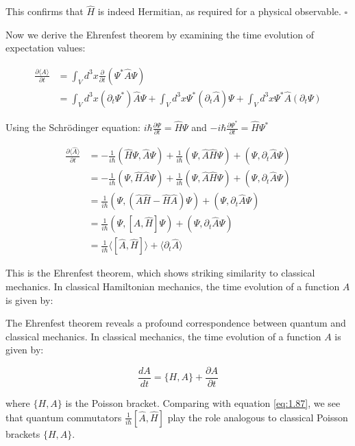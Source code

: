 \documentclass[italian]{HKNdocument}
\begin{document}
This confirms that $\hat{H}$ is indeed Hermitian, as required for a physical observable. $\square$

Now we derive the Ehrenfest theorem by examining the time evolution of expectation values:

\begin{align}
\frac{\partial\langle\hat{A}\rangle}{\partial t} &= \int_V d^3x\frac{\partial}{\partial t}(\Psi^*\hat{A}\Psi) \\
&= \int_V d^3x(\partial_t\Psi^*)\hat{A}\Psi + \int_V d^3x\Psi^*(\partial_t\hat{A})\Psi + \int_V d^3x\Psi^*\hat{A}(\partial_t\Psi)
\end{align}

Using the Schrödinger equation:
$i\hbar\frac{\partial\Psi}{\partial t} = \hat{H}\Psi$ and $-i\hbar\frac{\partial\Psi^*}{\partial t} = \hat{H}\Psi^*$

\begin{align}
\frac{\partial\langle\hat{A}\rangle}{\partial t} &= -\frac{1}{i\hbar}(\hat{H}\Psi, \hat{A}\Psi) + \frac{1}{i\hbar}(\Psi, \hat{A}\hat{H}\Psi) + (\Psi, \partial_t\hat{A}\Psi) \\
&= -\frac{1}{i\hbar}(\Psi, \hat{H}\hat{A}\Psi) + \frac{1}{i\hbar}(\Psi, \hat{A}\hat{H}\Psi) + (\Psi, \partial_t\hat{A}\Psi) \\
&= \frac{1}{i\hbar}(\Psi, (\hat{A}\hat{H} - \hat{H}\hat{A})\Psi) + (\Psi, \partial_t\hat{A}\Psi) \label{eq:1.87} \\
&= \frac{1}{i\hbar}(\Psi, [\hat{A}, \hat{H}]\Psi) + (\Psi, \partial_t\hat{A}\Psi) \\
&= \frac{1}{i\hbar}\langle[\hat{A}, \hat{H}]\rangle + \langle\partial_t\hat{A}\rangle
\end{align}

This is the Ehrenfest theorem, which shows striking similarity to classical mechanics. In classical Hamiltonian mechanics, the time evolution of a function $A$ is given by:


The Ehrenfest theorem reveals a profound correspondence between quantum and classical mechanics. In classical mechanics, the time evolution of a function $A$ is given by:

\begin{equation}
\frac{dA}{dt} = \{H,A\} + \frac{\partial A}{\partial t}
\end{equation}

where $\{H,A\}$ is the Poisson bracket. Comparing with equation \eqref{eq:1.87}, we see that quantum commutators $\frac{1}{i\hbar}[\hat{A},\hat{H}]$ play the role analogous to classical Poisson brackets $\{H,A\}$.
\end{document}
